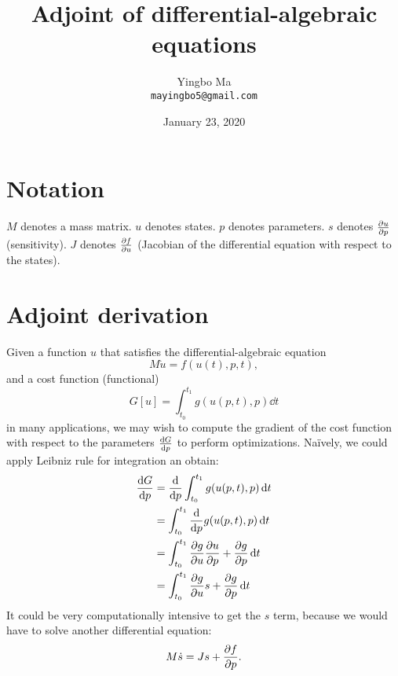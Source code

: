 \documentclass[a4paper,9pt,twocolumn]{article}
\theoremstyle{definition}
\theoremstyle{remark}
\begin{document}
\author{Yingbo Ma\\
        \tt{mayingbo5@gmail.com}}
\title{Adjoint of differential-algebraic equations}
\date{January 23, 2020}

\maketitle

\section{Notation}
$M$ denotes a mass matrix. $u$ denotes states. $p$ denotes parameters. $s$
denotes $\pdv{u}{p}$ (sensitivity). $J$ denotes $\pdv{f}{u}$ (Jacobian of the
differential equation with respect to the states).

\section{Adjoint derivation}
Given a function $u$ that satisfies the differential-algebraic equation
\begin{equation} \label{eq:de}
  M\dot{u} = f(u(t), p, t),
\end{equation}
and a cost function (functional)
\begin{equation}
  G[u] = \int_{t_0}^{t_1} g(u(p, t), p) \dd{t}
\end{equation}
in many applications, we may wish to compute the gradient of the cost function
with respect to the parameters $\dv{G}{p}$ to perform optimizations. Na\"ively,
we could apply Leibniz rule for integration an obtain:
\begin{align}
  \dv{G}{p} &= \dv{p} \int_{t_0}^{t_1} g(u(p, t), p) \dd{t} \\
            &= \int_{t_0}^{t_1} \dv{p} g(u(p, t), p) \dd{t} \\
            &= \int_{t_0}^{t_1} \pdv{g}{u}\pdv{u}{p} + \pdv{g}{p} \dd{t} \\
            &= \int_{t_0}^{t_1} \pdv{g}{u}s + \pdv{g}{p} \dd{t}
            \label{eq:dgdp}
\end{align}
It could be very computationally intensive to get the $s$ term, because
we would have to solve another differential equation:
\begin{equation} \label{eq:forward_sens}
  M\dot{s} = Js + \pdv{f}{p}.
\end{equation}
\end{document}

